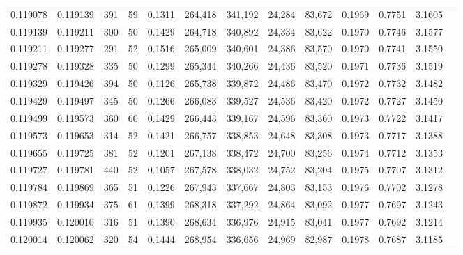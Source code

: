 \begin{tabular}{rrrrrrrrrrrrr}
0.119078 & 0.119139 &   391 &  59 &                                     0.1311 & 264,418 & 341,192 &  24,284 &  83,672 & 0.1969 & 0.7751 & 3.1605 \\
0.119139 & 0.119211 &   300 &  50 &                                     0.1429 & 264,718 & 340,892 &  24,334 &  83,622 & 0.1970 & 0.7746 & 3.1577 \\
0.119211 & 0.119277 &   291 &  52 &                                     0.1516 & 265,009 & 340,601 &  24,386 &  83,570 & 0.1970 & 0.7741 & 3.1550 \\
0.119278 & 0.119328 &   335 &  50 &                                     0.1299 & 265,344 & 340,266 &  24,436 &  83,520 & 0.1971 & 0.7736 & 3.1519 \\
0.119329 & 0.119426 &   394 &  50 &                                     0.1126 & 265,738 & 339,872 &  24,486 &  83,470 & 0.1972 & 0.7732 & 3.1482 \\
0.119429 & 0.119497 &   345 &  50 &                                     0.1266 & 266,083 & 339,527 &  24,536 &  83,420 & 0.1972 & 0.7727 & 3.1450 \\
0.119499 & 0.119573 &   360 &  60 &                                     0.1429 & 266,443 & 339,167 &  24,596 &  83,360 & 0.1973 & 0.7722 & 3.1417 \\
0.119573 & 0.119653 &   314 &  52 &                                     0.1421 & 266,757 & 338,853 &  24,648 &  83,308 & 0.1973 & 0.7717 & 3.1388 \\
0.119655 & 0.119725 &   381 &  52 &                                     0.1201 & 267,138 & 338,472 &  24,700 &  83,256 & 0.1974 & 0.7712 & 3.1353 \\
0.119727 & 0.119781 &   440 &  52 &                                     0.1057 & 267,578 & 338,032 &  24,752 &  83,204 & 0.1975 & 0.7707 & 3.1312 \\
0.119784 & 0.119869 &   365 &  51 &                                     0.1226 & 267,943 & 337,667 &  24,803 &  83,153 & 0.1976 & 0.7702 & 3.1278 \\
0.119872 & 0.119934 &   375 &  61 &                                     0.1399 & 268,318 & 337,292 &  24,864 &  83,092 & 0.1977 & 0.7697 & 3.1243 \\
0.119935 & 0.120010 &   316 &  51 &                                     0.1390 & 268,634 & 336,976 &  24,915 &  83,041 & 0.1977 & 0.7692 & 3.1214 \\
0.120014 & 0.120062 &   320 &  54 &                                     0.1444 & 268,954 & 336,656 &  24,969 &  82,987 & 0.1978 & 0.7687 & 3.1185 \\

\end{tabular}
